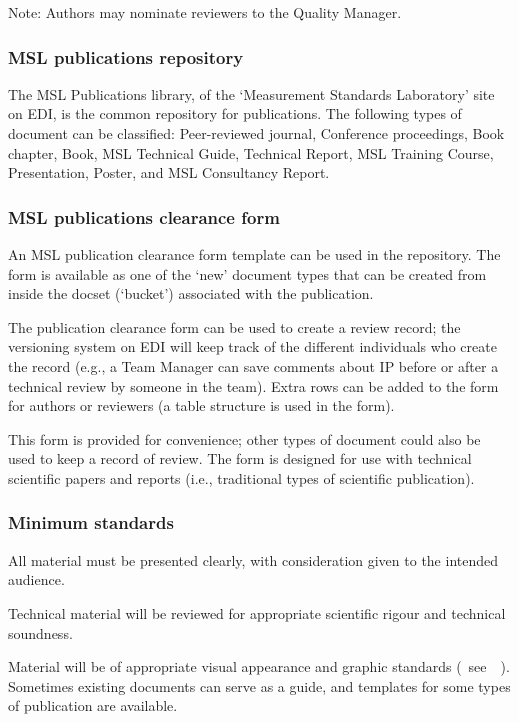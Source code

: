 Note: Authors may nominate reviewers to the Quality Manager.

\subsubsection{MSL publications repository}
 \label{sss:publications_repository}
The MSL Publications library, of the ‘Measurement Standards Laboratory’ site on EDI, is the common repository for publications.  The following types of document can be classified: Peer-reviewed journal, Conference proceedings, Book chapter, Book, MSL Technical Guide, Technical Report, MSL Training Course, Presentation, Poster, and MSL Consultancy Report. 

\subsubsection{MSL publications clearance form}
An MSL publication clearance form template can be used in the repository. The form is available as one of the ‘new’ document types that can be created from inside the docset (‘bucket’) associated with the publication.

The publication clearance form can be used to create a review record; the versioning system on EDI will keep track of the different individuals who create the record (e.g., a Team Manager can save comments about IP before or after a technical review by someone in the team). Extra rows can be added to the form for authors or reviewers (a table structure is used in the form).

This form is provided for convenience; other types of document could also be used to keep a record of review. The form is designed for use with technical scientific papers and reports (i.e., traditional types of scientific publication).  

\subsubsection{Minimum standards}
All material must be presented clearly, with consideration given to the intended audience.

Technical material will be reviewed for appropriate scientific rigour and technical soundness. 

Material will be of appropriate visual appearance and graphic standards (~see~\cite{MSL_Reporting_Guidelines}~). Sometimes existing documents can serve as a guide, and templates for some types of publication are available.  

